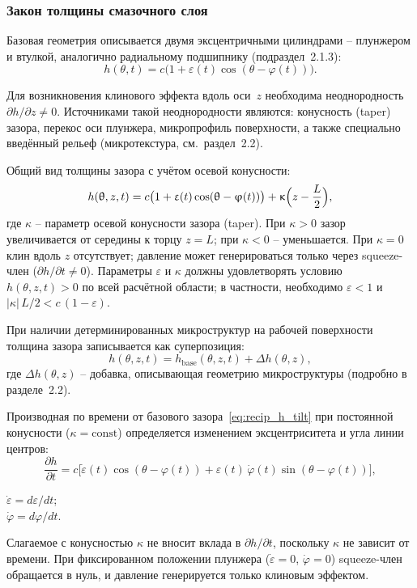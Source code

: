 \subsubsection*{Закон толщины смазочного слоя}

Базовая геометрия описывается двумя эксцентричными цилиндрами -- плунжером и втулкой, аналогично радиальному подшипнику (подраздел~2.1.3):
\begin{equation}
h(\theta, t) = c\bigl(1 + \varepsilon(t)\cos(\theta - \varphi(t))\bigr).
\label{eq:recip_h_base}
\end{equation}

Для возникновения клинового эффекта вдоль оси~$z$ необходима неоднородность $\partial h/\partial z \neq 0$. Источниками такой неоднородности являются: конусность (taper) зазора, перекос оси плунжера, микропрофиль поверхности, а также специально введённый рельеф (микротекстура, см.\ раздел~2.2).

Общий вид толщины зазора с учётом осевой конусности:
\begin{equation}
h(\theta, z, t) = c\bigl(1 + \varepsilon(t)\cos(\theta - \varphi(t))\bigr) + \kappa\Bigl(z - \frac{L}{2}\Bigr),
\label{eq:recip_h_tilt}
\end{equation}
где $\kappa$ -- параметр осевой конусности зазора (taper). При $\kappa > 0$ зазор увеличивается от середины к торцу $z = L$; при $\kappa < 0$ -- уменьшается. При $\kappa = 0$ клин вдоль $z$ отсутствует; давление может генерироваться только через squeeze-член ($\partial h/\partial t \neq 0$).
Параметры $\varepsilon$ и $\kappa$ должны удовлетворять условию $h(\theta, z, t) > 0$ по всей расчётной области; в частности, необходимо $\varepsilon < 1$ и $|\kappa|\,L/2 < c\,(1 - \varepsilon)$.

При наличии детерминированных микроструктур на рабочей поверхности толщина зазора записывается как суперпозиция:
\begin{equation}
h(\theta, z, t) = h_{\mathrm{base}}(\theta, z, t) + \Delta h(\theta, z),
\label{eq:recip_h_textured}
\end{equation}
где $\Delta h(\theta, z)$ -- добавка, описывающая геометрию микроструктуры (подробно в разделе~2.2).

Производная по времени от базового зазора~\eqref{eq:recip_h_tilt} при постоянной конусности ($\kappa = \mathrm{const}$) определяется изменением эксцентриситета и угла линии центров:
\begin{equation}
\frac{\partial h}{\partial t}
= c\bigl[\dot{\varepsilon}(t)\cos(\theta - \varphi(t))
       + \varepsilon(t)\,\dot{\varphi}(t)\sin(\theta - \varphi(t))\bigr],
\label{eq:recip_dhdt}
\end{equation}
\begin{conditions}
$\dot{\varepsilon} = d\varepsilon/dt$;\\
$\dot{\varphi} = d\varphi/dt$.
\end{conditions}
Слагаемое с конусностью $\kappa$ не вносит вклада в $\partial h/\partial t$, поскольку $\kappa$ не зависит от времени. При фиксированном положении плунжера ($\dot{\varepsilon} = 0$, $\dot{\varphi} = 0$) squeeze-член обращается в нуль, и давление генерируется только клиновым эффектом.


